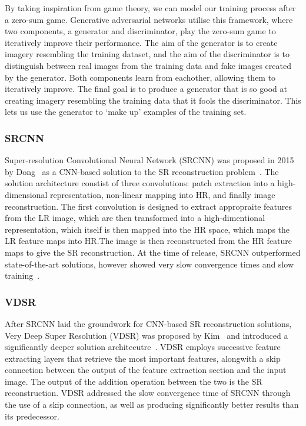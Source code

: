 By taking inspiration from game theory, we can model our training process after a zero-sum game. Generative adversarial networks utilise this framework, where two components, a generator and discriminator, play the zero-sum game to iteratively improve their performance. The aim of the generator is to create imagery resembling the training dataset, and the aim of the discriminator is to distinguish between real images from the training data and fake images created by the generator. Both components learn from eachother, allowing them to iteratively improve. The final goal is to produce a generator that is so good at creating imagery resembling the training data that it fools the discriminator. This lets us use the generator to `make up' examples of the training set.

\subsubsection{SRCNN}
Super-resolution Convolutional Neural Network (SRCNN) was proposed in 2015 by Dong \etal\ as a CNN-based solution to the SR reconstruction problem~\cite{srcnn}. The solution architecture constist of three convolutions: patch extraction into a high-dimensional representation, non-linear mapping into HR, and finally image reconstruction. The first convolution is designed to extract appropraite features from the LR image, which are then transformed into a high-dimentional representation, which itself is then mapped into the HR space, which maps the LR feature maps into HR.\@ The image is then reconstructed from the HR feature maps to give the SR reconstruction. At the time of release, SRCNN outperformed state-of-the-art solutions, however showed very slow convergence times and slow training~\cite{srcnn}.

\subsubsection{VDSR}
After SRCNN laid the groundwork for CNN-based SR reconstruction solutions, Very Deep Super Resolution (VDSR) was proposed by Kim \etal\ and introduced a significantly deeper solution architecutre~\cite{vdsr}. VDSR employs successive feature extracting layers that retrieve the most important features, alongwith a skip connection between the output of the feature extraction section and the input image. The output of the addition operation between the two is the SR reconstruction. VDSR addressed the slow convergence time of SRCNN through the use of a skip connection, as well as producing significantly better results than its predecessor.

